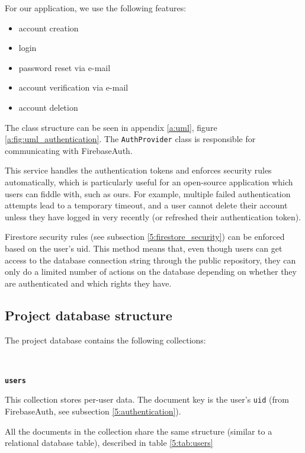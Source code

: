 For our application, we use the following features:
\begin{itemize}
    \setlength{\topsep}{0.5pt}
    \setlength{\itemsep}{0.5pt}
    \setlength{\parsep}{0.5pt}
    \item account creation
    \item login
    \item password reset via e-mail
    \item account verification via e-mail
    \item account deletion
\end{itemize}

The class structure can be seen in appendix \ref{a:uml}, figure \ref{a:fig:uml_authentication}. The \texttt{AuthProvider} class is responsible for communicating with FirebaseAuth.

This service handles the authentication tokens and enforces security rules automatically, which is particularly useful for an open-source application which users can fiddle with, such as ours. For example, multiple failed authentication attempts lead to a temporary timeout, and a user cannot delete their account unless they have logged in very recently (or refreshed their authentication token).

Firestore security rules (see subsection \ref{5:firestore_security}) can be enforced based on the user's \acrshort{uid}. This method means that, even though users can get access to the database connection string through the public repository, they can only do a limited number of actions on the database depending on whether they are authenticated and which rights they have.

\subsection{Project database structure} \label{5:database_project}
The project database contains the following collections:

~

\faDatabase \hspace{0.1cm} \textbf{\texttt{users}}

This collection stores per-user data. The document key is the user's \texttt{uid} (from FirebaseAuth, see subsection \ref{5:authentication}).

All the documents in the collection share the same structure (similar to a relational database table), described in table \ref{5:tab:users}

